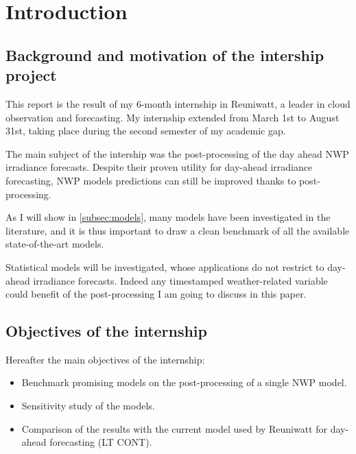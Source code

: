 \section{Introduction}
\subsection{Background and motivation of the intership project}
This report is the result of my 6-month internship in Reuniwatt, a leader in cloud observation and forecasting.
My internship extended from March 1st to August 31st, taking place during the second semester of my academic gap.

The main subject of the intership was the post-processing of the day ahead NWP irradiance forecasts.
Despite their proven utility for day-ahead irradiance forecasting, NWP models predictions can still be improved thanks to post-processing.

As I will show in \ref{subsec:models}, many models have been investigated in the literature, and it is thus important to draw a clean benchmark
of all the available state-of-the-art models.

Statistical models will be investigated, whose applications do not restrict to day-ahead irradiance forecasts. Indeed any timestamped weather-related variable could benefit
of the post-processing I am going to discuss in this paper.
\subsection{Objectives of the internship}
Hereafter the main objectives of the internship:
\begin{itemize}
    \item Benchmark promising models on the post-processing of a single NWP model.
    \item Sensitivity study of the models.
    \item Comparison of the results with the current model used by Reuniwatt for day-ahead forecasting (LT CONT).
\end{itemize}